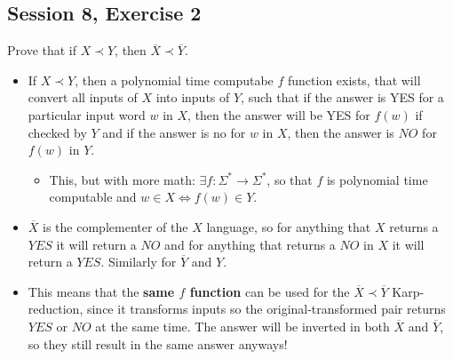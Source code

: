 \subsection {Session 8, Exercise 2}
\label{8f2}


Prove that if $X \prec Y$, then $\overline{X} \prec \overline{Y}$.



\begin{itemize}
    \item If $X \prec Y$, then a polynomial time computabe $f$ function exists, that will convert all inputs of $X$ into inputs of $Y$, such that if the answer is YES for a particular input word $w$ in $X$, then the answer will be YES for $f(w)$ if checked by $Y$ and if the answer is no for $w$ in $X$, then the answer is $NO$ for $f(w)$ in $Y$.
    \begin{itemize}
        \item This, but with more math: $\exists f: \Sigma^*\rightarrow\Sigma^*$, so that $f$ is polynomial time computable and $w\in{}X \Leftrightarrow f(w) \in{}Y$.
    \end{itemize}
    \item $\overline{X}$ is the complementer of the $X$ language, so for anything that $X$ returns a $YES$ it will return a $NO$ and for anything that returns a $NO$ in $X$ it will return a $YES$. Similarly for $\overline{Y}$ and $Y$.
    \item This means that the \textbf{same $f$ function} can be used for the $\overline{X} \prec \overline{Y}$ Karp-reduction, since it transforms inputs so the original-transformed pair returns $YES$ or $NO$ at the same time. The answer will be inverted in both $\overline{X}$ and $\overline{Y}$, so they still result in the same answer anyways!
\end{itemize}
